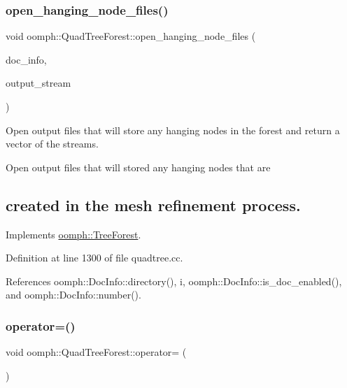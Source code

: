 \subsubsection{\texorpdfstring{open\+\_\+hanging\+\_\+node\+\_\+files()}{open\_hanging\_node\_files()}}
{\footnotesize\ttfamily void oomph\+::\+Quad\+Tree\+Forest\+::open\+\_\+hanging\+\_\+node\+\_\+files (\begin{DoxyParamCaption}\item[{\hyperlink{classoomph_1_1DocInfo}{Doc\+Info} \&}]{doc\+\_\+info,  }\item[{\hyperlink{classoomph_1_1Vector}{Vector}$<$ std\+::ofstream $\ast$$>$ \&}]{output\+\_\+stream }\end{DoxyParamCaption})\hspace{0.3cm}{\ttfamily [virtual]}}



Open output files that will store any hanging nodes in the forest and return a vector of the streams. 

Open output files that will stored any hanging nodes that are \subsection*{created in the mesh refinement process. }

Implements \hyperlink{classoomph_1_1TreeForest_a384793832d8ab83e23636597e5fe1e1a}{oomph\+::\+Tree\+Forest}.



Definition at line 1300 of file quadtree.\+cc.



References oomph\+::\+Doc\+Info\+::directory(), i, oomph\+::\+Doc\+Info\+::is\+\_\+doc\+\_\+enabled(), and oomph\+::\+Doc\+Info\+::number().

\mbox{\label{classoomph_1_1QuadTreeForest_a1769832f255924ad4805cb051bbaef9c}} 
\subsubsection{\texorpdfstring{operator=()}{operator=()}}
{\footnotesize\ttfamily void oomph\+::\+Quad\+Tree\+Forest\+::operator= (\begin{DoxyParamCaption}\item[{const \hyperlink{classoomph_1_1QuadTreeForest}{Quad\+Tree\+Forest} \&}]{ }\end{DoxyParamCaption})\hspace{0.3cm}{\ttfamily [inline]}}



